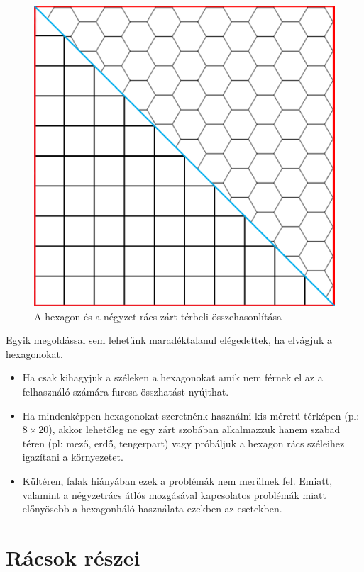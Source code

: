 \begin{figure}[h!]
\centering
\includegraphics[scale=0.1]{kepek/SqVsHex.png}
\caption{A hexagon és a négyzet rács zárt térbeli összehasonlítása}
\label{fig:SqVsHex}
\end{figure}

Egyik megoldással sem lehetünk maradéktalanul elégedettek, ha elvágjuk a hexagonokat. 

\begin{itemize}
\item Ha csak kihagyjuk a széleken a hexagonokat amik nem férnek el az a felhasználó számára furcsa összhatást nyújthat.
\item Ha mindenképpen hexagonokat  szeretnénk használni kis méretű térképen (pl: $8 \times 20$), akkor lehetőleg ne egy zárt szobában alkalmazzuk hanem szabad téren (pl: mező, erdő, tengerpart) vagy próbáljuk a hexagon rács széleihez igazítani a környezetet.
\item Kültéren, falak hiányában ezek a problémák nem merülnek fel. Emiatt, valamint a négyzetrács átlós mozgásával kapcsolatos problémák miatt előnyösebb a hexagonháló használata ezekben az esetekben.
\end{itemize}

\section{Rácsok részei}

